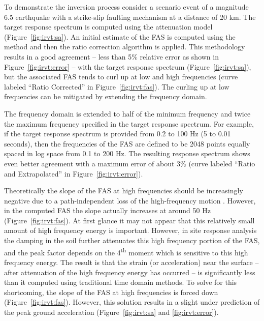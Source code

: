 \documentclass[11pt]{report}
\begin{document}
To demonstrate the inversion process consider a scenario event of a magnitude 6.5 earthquake with a
strike-slip faulting mechanism at a distance of 20 km.  The target response spectrum is computed
using the \citet{abrahamson:97} attenuation model (Figure~\ref{fig:irvt:sa}).  An initial estimate
of the FAS is computed using the \citet{gasparini:76} method and then the ratio correction algorithm
is applied.  This methodology results in a good agreement -- less than 5\% relative error as shown
in Figure~\ref{fig:irvt:error} -- with the target response spectrum (Figure~\ref{fig:irvt:sa}), but
the associated FAS tends to curl up at low and high frequencies (curve labeled ``Ratio Corrected''
in Figure~\ref{fig:irvt:fas}).  The curling up at low frequencies can be mitigated by extending the
frequency domain.  

The frequency domain is extended to half of the minimum frequency and twice the maximum
frequency specified in the target response spectrum.  For example, if the target response spectrum is provided from 0.2 to 100 Hz (5
to 0.01 seconds), then the frequencies of the FAS are defined to be 2048 points equally spaced in log
space from  0.1 to 200 Hz.  The resulting response spectrum shows even better agreement with a
maximum error of about 3\% (curve labeled ``Ratio and Extrapolated'' in Figure~\ref{fig:irvt:error}).  

Theoretically the slope of the FAS at high frequencies should be increasingly negative due to a
path-independent loss of the high-frequency motion \citep{boore:03}.  However, in the computed
FAS the slope actually increases at around 50 Hz (Figure~\ref{fig:irvt:fas}).  At first glance it
may not appear that this relatively small amount of high frequency energy is important.  However, in
site response analysis the damping in the soil further attenuates this high frequency portion of the
FAS, and the peak factor depends on the 4\textsuperscript{th} moment which is sensitive to this high
frequency energy.  The result is that the strain (or acceleration) near the surface -- after
attenuation of the high frequency energy has occurred -- is significantly less than it computed
using traditional time domain methods.  To solve for this shortcoming, the slope of the FAS at high
frequencies is forced down (Figure~\ref{fig:irvt:fas}).  However, this solution results in a slight under
prediction of the peak ground acceleration (Figure~\ref{fig:irvt:sa} and \ref{fig:irvt:error}).
\end{document}
